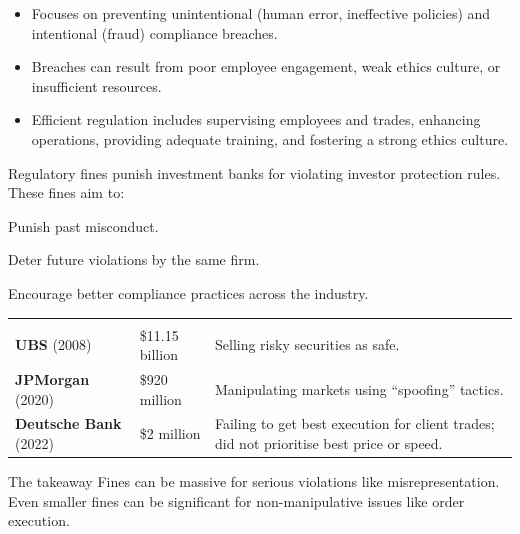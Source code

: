 
\begin{itemize}
\item Focuses on preventing unintentional (human error, ineffective policies) and
intentional (fraud) compliance breaches.
\item Breaches can result from poor employee engagement, weak ethics culture, or
insufficient resources.
\item Efficient regulation includes supervising employees and trades, enhancing
operations, providing adequate training, and fostering a strong ethics culture.
\end{itemize}



Regulatory fines punish investment banks for violating investor protection rules.
These fines aim to:

\begin{checks}
\item Punish past misconduct.
\item Deter future violations by the same firm.
\item Encourage better compliance practices across the industry.
\end{checks}

\noindent\begin{minipage}{\textwidth}
\renewcommand{\arraystretch}{1.35}
\begin{tabularx}{\textwidth}{@{}L{0.24\textwidth}L{0.17\textwidth}Y@{}}
  &  & \\
{\tabfont \textbf{UBS} (2008)} & {\tabfont \$11.15 billion} &
{\tabfont Selling risky securities as safe.}\\
{\tabfont \textbf{JPMorgan} (2020)} & {\tabfont \$920 million} &
{\tabfont Manipulating markets using ``spoofing'' tactics.}\\
{\tabfont \textbf{Deutsche Bank} (2022)} & {\tabfont \$2 million} &
{\tabfont Failing to get best execution for client trades; did not prioritise
best price or speed.}\\
\end{tabularx}
\end{minipage}

\begin{orexambox}{The takeaway}
Fines can be massive for serious violations like misrepresentation. Even smaller
fines can be significant for non-manipulative issues like order execution.
\end{orexambox}
